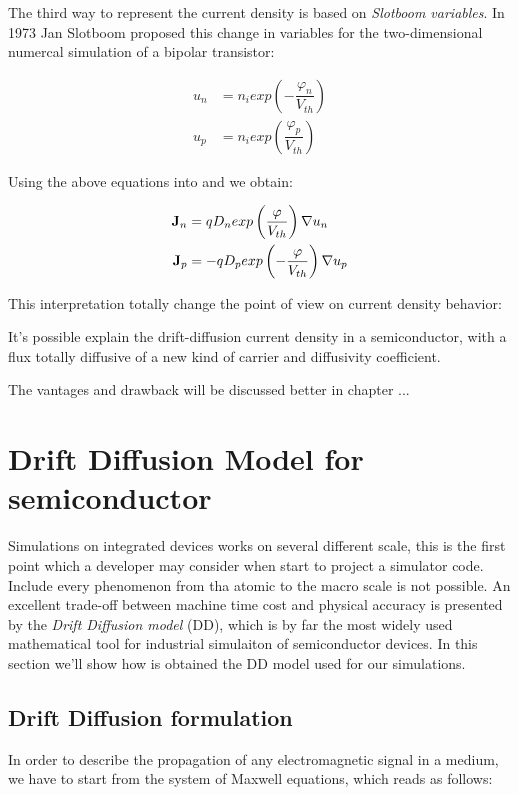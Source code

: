The third way to represent the current density is based on \textit{Slotboom variables}. In 1973 Jan Slotboom proposed this change in variables for the two-dimensional numercal simulation of a bipolar transistor:

\begin{align}
u_n &= n_iexp\left(-\dfrac{\varphi_n}{V_{th}} \right) \label{eq: un slotboom} \\
u_p &= n_iexp\left(\dfrac{\varphi_p}{V_{th}} \right) \label{eq: up slotboom} 
\end{align}

Using the above equations into  and  we obtain:

\begin{align}
\mathbf{J}_n &= qD_n exp\left(\dfrac{\varphi}{V_{th}}\right) \nabla u_n \\
\mathbf{J}_p &= -qD_p exp\left(-\dfrac{\varphi}{V_{th}}\right)  \nabla u_p 
\end{align}

This interpretation totally change the point of view on current density behavior:

\begin{Osservazione}
It's possible explain the drift-diffusion current density in a semiconductor, with a flux totally diffusive of a new kind of carrier and diffusivity coefficient. 
\end{Osservazione}

The vantages and drawback will be discussed better in chapter ...


\section{Drift Diffusion Model for semiconductor}

Simulations on integrated devices works on several different scale, this is the first point which a developer may consider when start to project a simulator code. Include every phenomenon from tha atomic to the macro scale is not possible. An excellent  trade-off between machine time cost and physical accuracy is presented by the \textit{Drift Diffusion model} (DD), which is by far the most widely used mathematical tool for industrial simulaiton of semiconductor devices. In this section we'll show how is obtained the DD model used for our simulations.

\subsection{Drift Diffusion formulation}
 In order to describe the propagation of any electromagnetic signal in a medium, we have to start from the system of Maxwell equations, which reads as follows:

